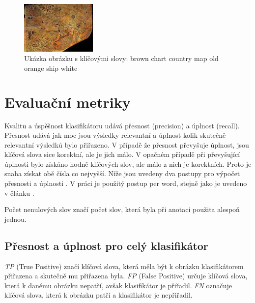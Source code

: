 \documentclass[czech,BP]{thesiskiv}
\begin{document}
\begin{figure}[h]
		\centering
		\includegraphics[width=140px]{./img/esp.jpg}	
		\caption{Ukázka obrázku s klíčovými slovy: brown chart country map old orange ship white}
\end{figure}



\chapter{Evaluační metriky}
\par Kvalitu a úspěšnost klasifikátoru udává přesnost (precision) a úplnost (recall). Přesnost udává jak moc jsou výsledky relevantní a úplnost kolik skutečně relevantní výsledků bylo přiřazeno. V případě že přesnost převyšuje úplnost, jsou klíčová slova sice korektní, ale je jich málo. V opačném případě při převyšující úplnosti bylo získáno hodně klíčových slov, ale málo z nich je korektních. Proto je snaha získat obě čísla co nejvyšší. Níže jsou uvedeny dva postupy pro výpočet přesnosti a úplnosti \cite{Result_A_A}.  V práci je použitý postup per word, stejně jako je uvedeno v článku \citep{JEC}. 
\par Počet nenulových slov značí počet slov, která byla při anotaci použita alespoň jednou. 

\section{Přesnost a úplnost pro celý klasifikátor}
\par \textit{TP} (True Positive) značí klíčová slova, která měla být k obrázku klasifikátorem přiřazena a skutečně mu přiřazena byla. \textit{FP} (False Positive) určuje klíčová slova, která k danému obrázku nepatří, avšak klasifikátor je přiřadil. \textit{FN} označuje klíčová slova, která k obrázku patří a klasifikátor je nepřiřadil. 
\end{document}

